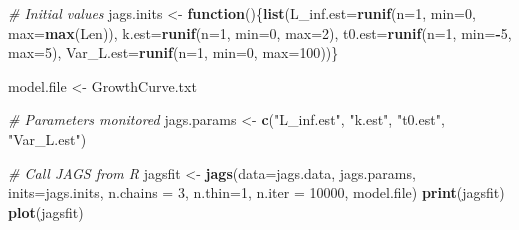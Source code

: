 \documentclass[
]{krantz}
\makeatletter
\newenvironment{Shaded}{\begin{snugshade}}{\end{snugshade}}
\newcommand{\AttributeTok}[1]{\textcolor[rgb]{0.27,0.27,0.27}{#1}}
\newcommand{\CommentTok}[1]{\textcolor[rgb]{0.37,0.37,0.37}{\textit{#1}}}
\newcommand{\ControlFlowTok}[1]{\textcolor[rgb]{0.27,0.27,0.27}{\textbf{#1}}}
\newcommand{\DecValTok}[1]{\textcolor[rgb]{0.06,0.06,0.06}{#1}}
\newcommand{\FunctionTok}[1]{\textcolor[rgb]{0.27,0.27,0.27}{\textbf{#1}}}
\newcommand{\NormalTok}[1]{#1}
\newcommand{\OtherTok}[1]{\textcolor[rgb]{0.37,0.37,0.37}{#1}}
\newcommand{\SpecialCharTok}[1]{\textcolor[rgb]{0.43,0.43,0.43}{\textbf{#1}}}
\newcommand{\StringTok}[1]{\textcolor[rgb]{0.5,0.5,0.5}{#1}}
\newenvironment{kframe}{%
\medskip{}
\setlength{\fboxsep}{.8em}
 \def\at@end@of@kframe{}%
 \ifinner\ifhmode%
  \def\at@end@of@kframe{\end{minipage}}%
  \begin{minipage}{\columnwidth}%
 \fi\fi%
 \def\FrameCommand##1{\hskip\@totalleftmargin \hskip-\fboxsep
 \colorbox{shadecolor}{##1}\hskip-\fboxsep
     \hskip-\linewidth \hskip-\@totalleftmargin \hskip\columnwidth}%
 \MakeFramed {\advance\hsize-\width
   \@totalleftmargin\z@ \linewidth\hsize
   \@setminipage}}%
 {\par\unskip\endMakeFramed%
 \at@end@of@kframe}
\renewenvironment{Shaded}{\begin{kframe}}{\end{kframe}}
\makeatother
\begin{document}
\begin{Shaded}
\begin{Highlighting}[]
\CommentTok{\# Initial values}
\NormalTok{jags.inits }\OtherTok{\textless{}{-}} \ControlFlowTok{function}\NormalTok{()\{}\FunctionTok{list}\NormalTok{(}\AttributeTok{L\_inf.est=}\FunctionTok{runif}\NormalTok{(}\AttributeTok{n=}\DecValTok{1}\NormalTok{, }\AttributeTok{min=}\DecValTok{0}\NormalTok{, }\AttributeTok{max=}\FunctionTok{max}\NormalTok{(Len)),}
                              \AttributeTok{k.est=}\FunctionTok{runif}\NormalTok{(}\AttributeTok{n=}\DecValTok{1}\NormalTok{, }\AttributeTok{min=}\DecValTok{0}\NormalTok{, }\AttributeTok{max=}\DecValTok{2}\NormalTok{),}
                              \AttributeTok{t0.est=}\FunctionTok{runif}\NormalTok{(}\AttributeTok{n=}\DecValTok{1}\NormalTok{, }\AttributeTok{min=}\SpecialCharTok{{-}}\DecValTok{5}\NormalTok{, }\AttributeTok{max=}\DecValTok{5}\NormalTok{),}
                              \AttributeTok{Var\_L.est=}\FunctionTok{runif}\NormalTok{(}\AttributeTok{n=}\DecValTok{1}\NormalTok{, }\AttributeTok{min=}\DecValTok{0}\NormalTok{, }\AttributeTok{max=}\DecValTok{100}\NormalTok{))\}}

\NormalTok{model.file }\OtherTok{\textless{}{-}} \StringTok{\textquotesingle{}GrowthCurve.txt\textquotesingle{}}

\CommentTok{\# Parameters monitored}
\NormalTok{jags.params }\OtherTok{\textless{}{-}} \FunctionTok{c}\NormalTok{(}\StringTok{"L\_inf.est"}\NormalTok{, }\StringTok{"k.est"}\NormalTok{, }\StringTok{"t0.est"}\NormalTok{, }\StringTok{"Var\_L.est"}\NormalTok{)}

\CommentTok{\# Call JAGS from R}
\NormalTok{jagsfit }\OtherTok{\textless{}{-}} \FunctionTok{jags}\NormalTok{(}\AttributeTok{data=}\NormalTok{jags.data, jags.params, }\AttributeTok{inits=}\NormalTok{jags.inits,}
                \AttributeTok{n.chains =} \DecValTok{3}\NormalTok{, }\AttributeTok{n.thin=}\DecValTok{1}\NormalTok{, }\AttributeTok{n.iter =} \DecValTok{10000}\NormalTok{,}
\NormalTok{                model.file)}
\FunctionTok{print}\NormalTok{(jagsfit)}
\FunctionTok{plot}\NormalTok{(jagsfit)}


\end{Highlighting}
\end{Shaded}
\end{document}
